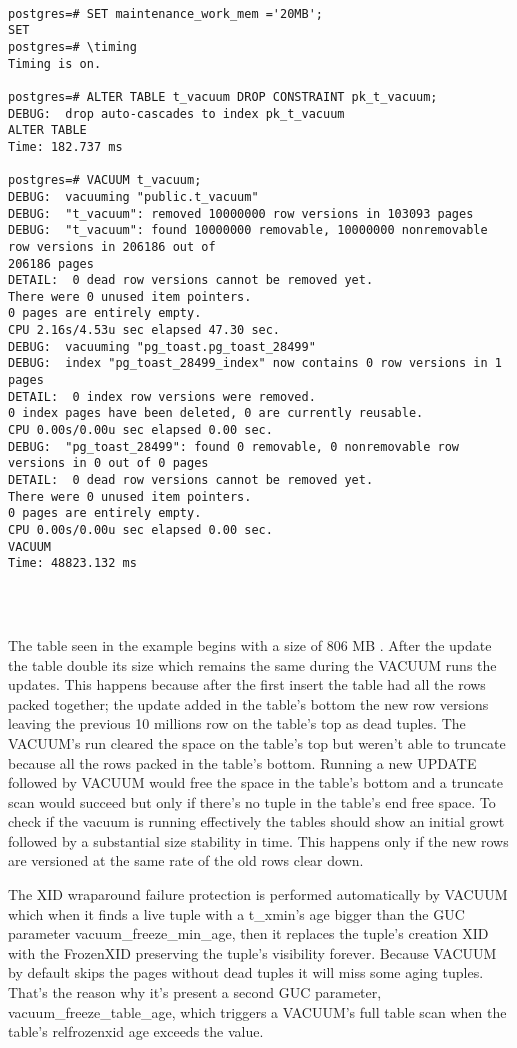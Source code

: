 \begin{lstlisting}[style=pgsql]

postgres=# SET maintenance_work_mem ='20MB';
SET
postgres=# \timing
Timing is on.

postgres=# ALTER TABLE t_vacuum DROP CONSTRAINT pk_t_vacuum;
DEBUG:  drop auto-cascades to index pk_t_vacuum
ALTER TABLE
Time: 182.737 ms

postgres=# VACUUM t_vacuum;
DEBUG:  vacuuming "public.t_vacuum"
DEBUG:  "t_vacuum": removed 10000000 row versions in 103093 pages
DEBUG:  "t_vacuum": found 10000000 removable, 10000000 nonremovable row versions in 206186 out of 
206186 pages
DETAIL:  0 dead row versions cannot be removed yet.
There were 0 unused item pointers.
0 pages are entirely empty.
CPU 2.16s/4.53u sec elapsed 47.30 sec.
DEBUG:  vacuuming "pg_toast.pg_toast_28499"
DEBUG:  index "pg_toast_28499_index" now contains 0 row versions in 1 pages
DETAIL:  0 index row versions were removed.
0 index pages have been deleted, 0 are currently reusable.
CPU 0.00s/0.00u sec elapsed 0.00 sec.
DEBUG:  "pg_toast_28499": found 0 removable, 0 nonremovable row versions in 0 out of 0 pages
DETAIL:  0 dead row versions cannot be removed yet.
There were 0 unused item pointers.
0 pages are entirely empty.
CPU 0.00s/0.00u sec elapsed 0.00 sec.
VACUUM
Time: 48823.132 ms




\end{lstlisting}

The table seen in the example begins with a size of 806 MB . After the update the table double its 
size which remains the same during the VACUUM runs the updates. This happens because after the 
first insert the table had all the rows packed together; the update added in the table's bottom the 
new row versions leaving the previous 10 millions row on the table's top as dead tuples. The 
VACUUM's run cleared the space on the table's top but weren't able to truncate because all 
the rows packed in the table's bottom. Running a new UPDATE followed by VACUUM would free the space 
in the table's bottom and a truncate scan would succeed but only if there's no tuple in the table's 
end free space. To check if the vacuum is running effectively the tables should show an initial 
growt followed by a substantial size stability in time. This happens only if the new rows are 
versioned at the same rate of the old rows clear down.\newline

The XID wraparound failure protection is performed automatically by VACUUM which when it finds a 
live tuple with a t\_xmin's age bigger than the GUC parameter vacuum\_freeze\_min\_age, then it 
replaces the tuple's creation XID with the FrozenXID preserving the tuple's visibility forever. 
Because VACUUM by default skips the pages without dead tuples it will miss some aging tuples. 
That's the reason why it's present a second GUC parameter, vacuum\_freeze\_table\_age, which 
triggers a VACUUM's full table scan when the table's relfrozenxid age exceeds the value.\newline

